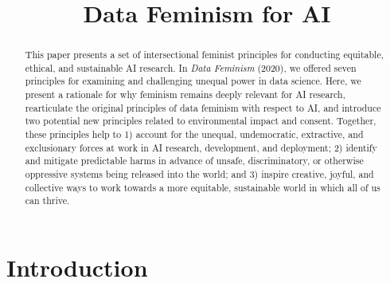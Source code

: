 
\title{Data Feminism for AI}
\begin{abstract}
This paper presents a set of intersectional feminist principles for conducting 
equitable, ethical, and sustainable AI research. In \textit{Data Feminism} (2020), we offered seven principles for examining and challenging unequal power in data science. Here, we present a rationale for why feminism remains deeply relevant for AI research, rearticulate the original principles of data feminism with respect to AI, and introduce two potential new principles related to environmental impact and consent. Together, these principles help to 1) account for the unequal, undemocratic, extractive, and exclusionary forces at work in AI research, development, and deployment; 2) identify and mitigate predictable harms in advance of unsafe, discriminatory, or otherwise oppressive systems being released into the world; and 3) inspire creative, joyful, and collective ways to work towards a more equitable, sustainable world in which all of us can thrive.
\end{abstract}
\maketitle

\section{Introduction}

